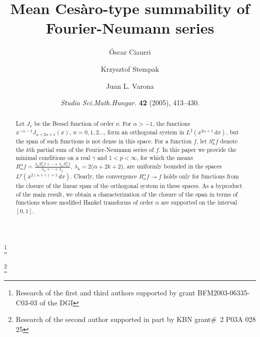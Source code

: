 \documentclass[a4paper]{amsart}
\date{\textit{Studia Sci.\@ Math.\@ Hungar.\@} \textbf{42} (2005), 413--430.}
\begin{document}

\title[Mean Ces\`aro-type summability of Fourier-Neumann series]{Mean
Ces\`aro-type summability of Fourier-Neumann series}


\author[ \'O. Ciaurri]{\'Oscar Ciaurri}
\address{Departamento de Matem\'aticas y Computaci\'on,
Universidad de La Rioja,
Edificio J.~L.~Vives,
Calle Luis de Ulloa s/n,
26004 Logro\~no, Spain}

\thanks{Research of the first and third authors supported by grant
BFM2003-06335-C03-03 of the DGI} %

\author[K. Stempak]{Krzysztof Stempak}
\address{Instytut Matematyki,
Politechnika Wroc\l{a}wska,
Wyb.~Wyspia\'nskiego 27,
50-370 Wro\-c\l{a}w,
Poland}

\thanks{Research of the second author supported in part by
KBN grant\#~2 P03A 028 25}

\author[J. L. Varona]{Juan L. Varona}

\address{Departamento de Matem\'aticas y Computaci\'on,
Universidad de La Rioja, Edificio J.~L.~Vives,
Calle Luis de Ulloa s/n, 26004 Logro\~no, Spain}



\begin{abstract}
Let $J_\nu$ be the Bessel function of order $\nu$. For $\alpha>-1$, the
functions $x^{-\alpha-1}J_{\alpha+2n+1}(x)$, $n=0,1,2\dots$, form an
orthogonal system in $L^2(x^{2\alpha+1}\,dx)$, but the span of such functions
is not dense in this space. For a function $f$, let $S_k^{\alpha}f$ denote
the $k$th partial sum of the Fourier-Neumann series of $f$. In this paper we
provide the minimal conditions on a real $\gamma$
and $1<p<\infty$, for which the means
$R_n^{\alpha}f = \frac{\lambda_0 S_0^{\alpha}f + \cdots
+ \lambda_n S_n^{\alpha}f}{\lambda_0 + \cdots + \lambda_n}$,
$\lambda_k = 2(\alpha+2k+2$), are uniformly bounded in the spaces
$L^p(x^{2(\alpha+\gamma)+1}\,dx)$. Clearly, the convergence
$R_n^{\alpha}f\to f$ holds only for functions from the closure
of the linear span of the orthogonal system in these spaces.
As a byproduct of the main result, we obtain a characterization of the closure of
the span in terms of functions whose modified Hankel transforms of order $\alpha$
are supported on the interval $[0,1]$.
\end{abstract}
\end{document}
